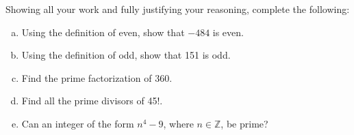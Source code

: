 \documentclass[11pt,letterpaper]{article}
\begin{document}

 Showing all your work and fully justifying your reasoning, complete the following:
	\begin{enumerate}[(a)]
	\item Using the definition of even, show that $-484$ is even.
	\item Using the definition of odd, show that 151 is odd.
	\item Find the prime factorization of 360. 
	\item Find all the prime divisors of 45!. 
	\item Can an integer of the form $n^4 - 9$, where $n \in \mathbb{Z}$, be prime?
	\end{enumerate} \pspace
\end{document}
